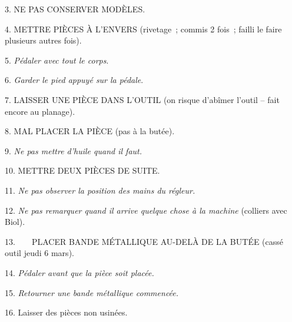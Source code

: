 \documentclass[french,twoside]{book} %
\begin{document}
3. NE PAS CONSERVER MODÈLES.\par
4. METTRE PIÈCES À L'ENVERS (rivetage ; commis 2 fois ; failli le faire plusieurs autres fois).\par
5. {\itshape Pédaler avec tout le corps}.\par
6. {\itshape Garder le pied appuyé sur la pédale}.\par
7. LAISSER UNE PIÈCE DANS L'OUTIL (on risque d'abîmer l'outil – fait encore au planage).\par
8. MAL PLACER LA PIÈCE (pas à la butée).\par
9. {\itshape Ne pas mettre d'huile quand il faut.}\par
10. METTRE DEUX PIÈCES DE SUITE.\par
11. {\itshape Ne pas observer la position des mains du régleur.}\par
12. {\itshape Ne pas remarquer quand il arrive quelque chose à la machine} (colliers avec Biol).\par
13.    PLACER BANDE MÉTALLIQUE AU-DELÀ DE LA BUTÉE (cassé outil jeudi 6 mars).\par
14. {\itshape Pédaler avant que la pièce soit placée.}\par
15. {\itshape Retourner une bande métallique commencée.}\par
16. Laisser des pièces non usinées.\par
\end{document}
